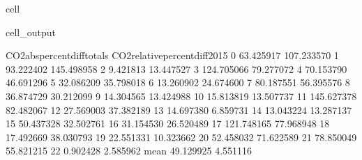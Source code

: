\documentclass[letterpaper,10pt,english]{jupyterBook}
\begin{document}
\begin{sphinxuseclass}{cell}
\begin{sphinxVerbatimOutput}
\begin{sphinxuseclass}{cell_output}
\begin{sphinxVerbatim}[commandchars=\\\{\}]
      CO2\PYGZus{}abs\PYGZus{}percent\PYGZus{}diff\PYGZus{}totals  CO2\PYGZus{}relative\PYGZus{}percent\PYGZus{}diff\PYGZus{}2015  \PYGZbs{}
0                       63.425917                     \PYGZhy{}107.233570   
1                       93.222402                     \PYGZhy{}145.498958   
2                        9.421813                      \PYGZhy{}13.447527   
3                      124.705066                       79.277072   
4                       70.153790                       46.691296   
5                       32.086209                      \PYGZhy{}35.798018   
6                       13.260902                       24.674600   
7                       80.187551                       56.395576   
8                       36.874729                       30.212099   
9                       14.304565                      \PYGZhy{}13.424988   
10                      15.813819                       13.507737   
11                     145.627378                       82.482067   
12                      27.569003                       37.382189   
13                      14.697380                       \PYGZhy{}6.859731   
14                      13.043224                       13.287137   
15                      50.437328                       32.502761   
16                      31.154530                      \PYGZhy{}26.520489   
17                     121.748165                       77.968948   
18                      17.492669                      \PYGZhy{}38.030793   
19                      22.551331                       10.323662   
20                      52.458032                      \PYGZhy{}71.622589   
21                      78.850049                       55.821215   
22                       0.902428                        2.585962   
mean                    49.129925                        4.551116   


\end{sphinxVerbatim}
\end{sphinxuseclass}
\end{sphinxVerbatimOutput}
\end{sphinxuseclass}
\end{document}
